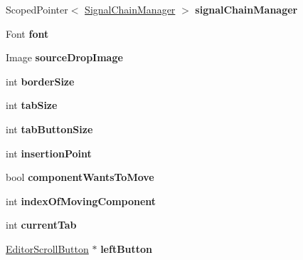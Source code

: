 \begin{DoxyCompactItemize}
\item 
\hypertarget{classEditorViewport_addbe939901e75ce05fd7c6bc25ed8099}{Scoped\-Pointer$<$ \hyperlink{classSignalChainManager}{Signal\-Chain\-Manager} $>$ {\bfseries signal\-Chain\-Manager}}\label{classEditorViewport_addbe939901e75ce05fd7c6bc25ed8099}

\item 
\hypertarget{classEditorViewport_a742248bc2ce37fd7e511e027b8369579}{Font {\bfseries font}}\label{classEditorViewport_a742248bc2ce37fd7e511e027b8369579}

\item 
\hypertarget{classEditorViewport_a0a000a563a6839777c1e37a382b99990}{Image {\bfseries source\-Drop\-Image}}\label{classEditorViewport_a0a000a563a6839777c1e37a382b99990}

\item 
\hypertarget{classEditorViewport_a6efd91ca1ea24c0f728c420f5a9a5c3d}{int {\bfseries border\-Size}}\label{classEditorViewport_a6efd91ca1ea24c0f728c420f5a9a5c3d}

\item 
\hypertarget{classEditorViewport_a9a6174e30d66ec370e34380346d31880}{int {\bfseries tab\-Size}}\label{classEditorViewport_a9a6174e30d66ec370e34380346d31880}

\item 
\hypertarget{classEditorViewport_aea33d0cdc5fdd65ad1ba286ce8b160c8}{int {\bfseries tab\-Button\-Size}}\label{classEditorViewport_aea33d0cdc5fdd65ad1ba286ce8b160c8}

\item 
\hypertarget{classEditorViewport_a4232494d0a71542296b93c7eaa7da579}{int {\bfseries insertion\-Point}}\label{classEditorViewport_a4232494d0a71542296b93c7eaa7da579}

\item 
\hypertarget{classEditorViewport_a26f22e7827e51fb66d3a5262e90ef6ab}{bool {\bfseries component\-Wants\-To\-Move}}\label{classEditorViewport_a26f22e7827e51fb66d3a5262e90ef6ab}

\item 
\hypertarget{classEditorViewport_a05ba5e48e39f716d312c1667e9a80954}{int {\bfseries index\-Of\-Moving\-Component}}\label{classEditorViewport_a05ba5e48e39f716d312c1667e9a80954}

\item 
\hypertarget{classEditorViewport_ad10d97f0189b0c4bba4d3998f91c24e2}{int {\bfseries current\-Tab}}\label{classEditorViewport_ad10d97f0189b0c4bba4d3998f91c24e2}

\item 
\hypertarget{classEditorViewport_acac49fef76c61a2c390f61940d859283}{\hyperlink{classEditorScrollButton}{Editor\-Scroll\-Button} $\ast$ {\bfseries left\-Button}}\label{classEditorViewport_acac49fef76c61a2c390f61940d859283}


\end{DoxyCompactItemize}
